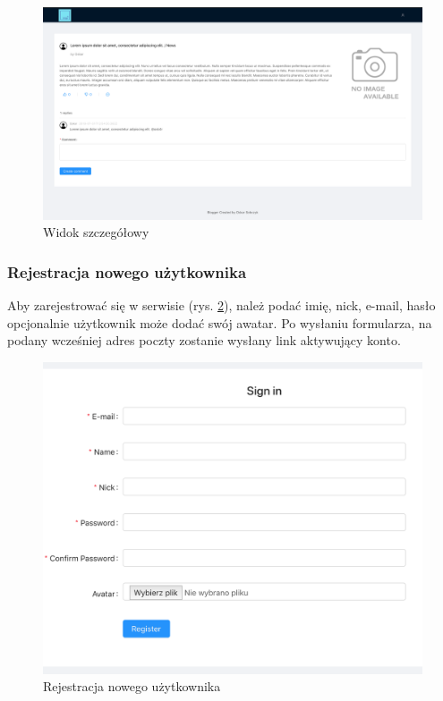 \documentclass[declaration,shortabstract]{iithesis}
\begin{document}
\begin{figure}
    \centering
    \includegraphics[width=\textwidth]{images/widok_postu.png}
    \caption{Widok szczegółowy}
    \label{fig:post_view}
\end{figure}

\subsubsection{Rejestracja nowego użytkownika}
Aby zarejestrować się w serwisie (rys. \ref{fig:register}), należ podać imię, nick, e-mail, hasło opcjonalnie użytkownik może dodać swój awatar. Po wysłaniu formularza, na podany wcześniej adres poczty zostanie wysłany link aktywujący konto.

\begin{figure}
    \centering
    \includegraphics[width=\textwidth]{images/rejestracja.png}
    \caption{Rejestracja nowego użytkownika}
    \label{fig:register}
\end{figure}
\end{document}
